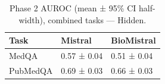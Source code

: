 \begin{table}
\caption{Phase 2 AUROC (mean ± 95\% CI half-width), combined tasks — Hidden.}
\label{tab:phase2_auroc_all_hidden_probe_oof}
\begin{tabular}{lll}
\toprule
Task & Mistral & BioMistral \\
\midrule
MedQA & 0.57 ± 0.04 & 0.51 ± 0.04 \\
PubMedQA & 0.69 ± 0.03 & 0.66 ± 0.03 \\
\bottomrule
\end{tabular}
\end{table}
